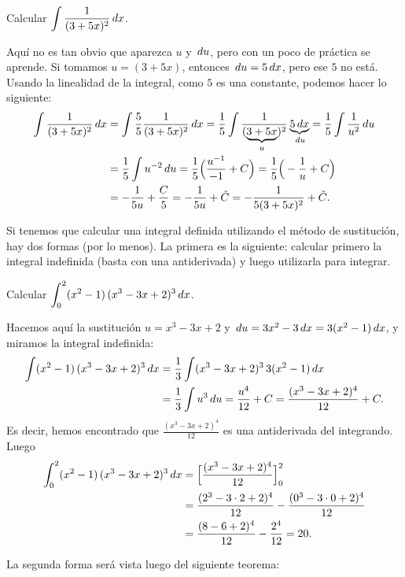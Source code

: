 \begin{example}
  Calcular $\displaystyle \int \frac{1}{(3+5x)^2}\,dx$. 
  
  Aquí no es tan obvio que aparezca $u$ y $\,du$, pero con un poco de práctica se aprende.
  Si tomamos $u=(3+5x)$, entonces $\,du = 5\,dx$, pero ese $5$ no está. Usando la linealidad de la integral, como $5$ es una constante, podemos hacer lo siguiente:
  \begin{align*}
    \int \frac{1}{(3+5x)^2}\,dx &= \int \frac55 \frac{1}{(3+5x)^2}\,dx
    = \frac15 \int \frac{1}{(\underbrace{3+5x}_u)^2} \underbrace{5\,dx}_{\,du}
    = \frac15 \int \frac{1}{u^2} \,du 
    \\
    &= \frac15 \int u^{-2} \,du
    = \frac15 \Big(\frac{u^{-1}}{-1}+C\Big)
    = \frac15 \Big(-\frac{1}{u}+C\Big)
    \\
    &= -\frac{1}{5u}+\frac{C}5
    = -\frac{1}{5u}+\tilde C
    = -\frac{1}{5(3+5x)^2}+\tilde C.
  \end{align*}
\end{example}

Si tenemos que calcular una integral definida utilizando el método de sustitución, hay dos formas (por lo menos).
La primera es la siguiente: calcular primero la integral indefinida (basta con una antiderivada) y luego utilizarla para integrar.

\begin{example}
  Calcular $\displaystyle \int_0^2 (x^2-1) \, (x^3-3x+2)^3 \,dx$.

  Hacemos aquí la sustitución $u=x^3-3x+2$ y $\,du = 3x^2-3\,dx=3(x^2-1)\,dx$,
  y miramos la integral indefinida:
  \begin{align*}
    \int (x^2-1) \, (x^3-3x+2)^3 \,dx &= \frac13 \int  (x^3-3x+2)^3\, 3(x^2-1) \,dx
    \\
    &=\frac13\int u^3 \,du = \frac{u^4}{12} + C = \frac{(x^3-3x+2)^4}{12} + C.
  \end{align*}
  Es decir, hemos encontrado que $\frac{(x^3-3x+2)^4}{12}$ es una antiderivada del integrando.
  Luego
  \begin{align*}
    \int_0^2 (x^2-1) \, (x^3-3x+2)^3 \,dx 
    &= \Big[
      \frac{(x^3-3x+2)^4}{12}
      \Big]_0^2
      \\
      &= \frac{(2^3-3\cdot 2+2)^4}{12} - \frac{(0^3-3\cdot 0+2)^4}{12}
      \\
      &=   \frac{(8-6+2)^4}{12} - \frac{2^4}{12} = 20.
  \end{align*}  
\end{example}

La segunda forma será vista luego del siguiente teorema:

